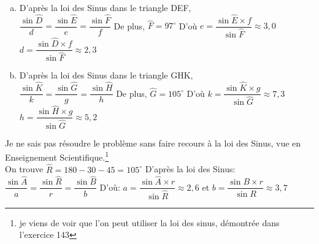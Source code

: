 \documentclass[12pt, a4paper]{article}
\begin{document}
\begin{Exercise}[number={144}]
    \begin{enumerate}[a)]
        \item D'après la loi des Sinus dans le triangle DEF, \\ \quad $\dfrac{\sin{\widehat{D}}}{d}=\dfrac{\sin{\widehat{E}}}{e}=\dfrac{\sin{\widehat{F}}}{f}$ \qquad De plus, \quad $\widehat{F}=97^{\circ}$ \medbreak D'où \quad $e=\dfrac{\sin{\widehat{E}}\times f}{\sin{\widehat{F}}}\approx 3{,}0$ \qquad $d=\dfrac{\sin{\widehat{D}}\times f}{\sin{\widehat{F}}}\approx 2{,}3$ \medbreak
        \item D'après la loi des Sinus dans le triangle GHK, \\ \quad $\dfrac{\sin{\widehat{K}}}{k}=\dfrac{\sin{\widehat{G}}}{g}=\dfrac{\sin{\widehat{H}}}{h}$ \qquad De plus, \quad $\widehat{G}=105^{\circ}$ \medbreak D'où \quad $k=\dfrac{\sin{\widehat{K}}\times g}{\sin{\widehat{G}}}\approx 7{,}3$ \qquad $h=\dfrac{\sin{\widehat{H}}\times g}{\sin{\widehat{G}}}\approx 5{,}2$
    \end{enumerate}
\end{Exercise}

\begin{Exercise}[number={146}]
    \begin{minipage}{\dimexpr\textwidth-10px-\parindent\relax}
    \medbreak Je ne sais pas résoudre le problème sans faire recours à la loi des Sinus, vue en Enseignement Scientifique.\footnote{je viens de voir que l'on peut utiliser la loi des sinus, démontrée dans l'exercice 143} \\
    On trouve $\widehat{R}=180-30-45=105^{\circ}$ \bigbreak
    D'après la loi des Sinus: \qquad $\dfrac{\sin{\widehat{A}}}{a}=\dfrac{\sin{\widehat{R}}}{r}=\dfrac{\sin{\widehat{B}}}{b}$ \medbreak
    D'où: \quad $a=\dfrac{\sin{\widehat{A}\times r}}{\sin{\widehat{R}}}\approx 2{,}6$ \quad et \quad $b=\dfrac{\sin{B}\times r}{\sin{R}}\approx 3{,}7$
    \end{minipage}
\end{Exercise}
\end{document}
